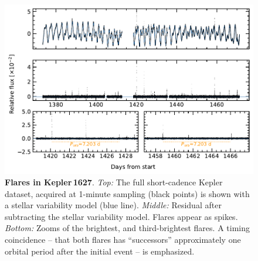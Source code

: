 \documentclass[12pt,modern,tighten]{aastex63}
\begin{document}
\begin{figure}[t]
	\begin{center}
		\leavevmode
		\includegraphics[width=1\textwidth]{f7.pdf}
	\end{center}
	\vspace{-0.7cm}
	\caption{
		{\bf Flares in Kepler\,1627}.  
    {\it Top:}
    The full short-cadence Kepler dataset, acquired at 1-minute
    sampling (black points) is shown with a stellar variability model
    (blue line).
    {\it Middle:}
    Residual after subtracting the stellar variability model.  Flares
    appear as spikes.
    {\it Bottom:}
    Zooms of the brightest, and third-brightest flares.  A timing
    coincidence -- that both flares has ``successors'' approximately
    one orbital period after the initial event -- is emphasized.
		\label{fig:flarezoom}
	}
\end{figure}
\end{document}
